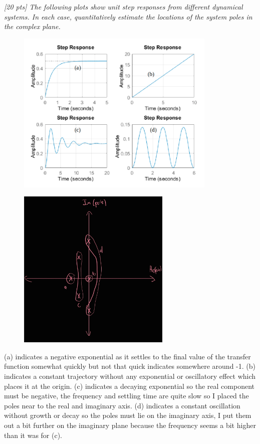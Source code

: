 \documentclass{article}
\begin{document}
\textit{[20 pts] The following plots show unit step responses from different dynamical systems. In each case, quantitatively estimate the locations of the system poles in the complex plane.}

\begin{figure}[H]
    \centering
    \includegraphics[width=0.85\textwidth]{q4fig.png}
\end{figure}

\begin{figure}[H]
    \centering
    \includegraphics[width=0.65\textwidth]{q4plot.jpg}
\end{figure}

(a) indicates a negative exponential as it settles to the final value of the transfer function somewhat quickly but not that quick indicates somewhere around -1.
(b) indicates a constant trajectory without any exponential or oscillatory effect which places it at the origin.
(c) indicates a decaying exponential so the real component must be negative, the frequency and settling time are quite slow so I placed the poles near to the real and imaginary axis.
(d) indicates a constant oscillation without growth or decay so the poles must lie on the imaginary axis, I put them out a bit further on the imaginary plane because the frequency seems a bit higher than it was for (c).
\end{document}
